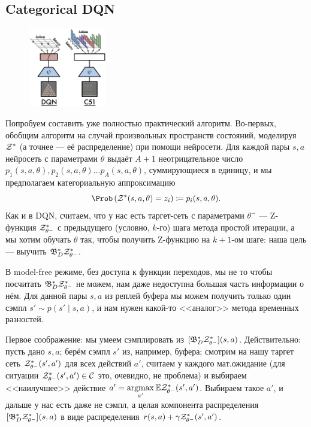 \subsection{Categorical DQN}\label{subsec:c51}

\begin{figure}
\vspace{-0.5cm}
\centering
\includegraphics[width=0.3\textwidth]{Images/c51.png}
\vspace{-0.5cm}
\end{figure}
Попробуем составить уже полностью практический алгоритм. Во-первых, обобщим алгоритм на случай произвольных пространств состояний, моделируя $\mathcal{Z}^*$ (а точнее --- её распределение) при помощи нейросети. Для каждой пары $s, a$ нейросеть с параметрами $\theta$ выдаёт $A+1$ неотрицательное число $p_1(s, a, \theta), p_2(s, a, \theta) \dots p_A(s, a, \theta)$, суммирующиеся в единицу, и мы предполагаем категориальную аппроксимацию
$$\Prob \left( \Z^*(s, a, \theta) = z_i \right) \coloneqq p_i(s, a, \theta).$$
Как и в DQN, считаем, что у нас есть таргет-сеть с параметрами $\theta^{-}$ --- Z-функция $\mathcal{Z}^*_{\theta^-}$ с предыдущего (условно, $k$-го) шага метода простой итерации, а мы хотим обучать $\theta$ так, чтобы получить Z-функцию на $k+1$-ом шаге: наша цель --- выучить $\mathfrak{B}^*_D \mathcal{Z}^*_{\theta^-}$. 

В model-free режиме, без доступа к функции переходов, мы не то чтобы посчитать $\mathfrak{B}^*_D \mathcal{Z}^*_{\theta^-}$ не можем, нам даже недоступна большая часть информации о нём. Для данной пары $s, a$ из реплей буфера мы можем получить только один сэмпл $s' \sim p(s' \mid s, a)$, и нам нужен какой-то <<аналог>> метода временных разностей.

Первое соображение: мы умеем сэмплировать из $[\mathfrak{B}^*_D \mathcal{Z}^*_{\theta^-}](s, a)$. Действительно: пусть дано $s, a$; берём сэмпл $s'$ из, например, буфера; смотрим на нашу таргет сеть $\mathcal{Z}^*_{\theta^-}(s', a')$ для всех действий $a'$, считаем у каждого мат.ожидание (для ситуации $\mathcal{Z}^*_{\theta^-}(s', a') \in \mathcal{C}$ это, очевидно, не проблема) и выбираем <<наилучшее>> действие $a' \HM= \argmax\limits_{a'} \E \Z^*_{\theta^-}(s', a')$. Выбираем такое $a'$, и дальше у нас есть даже не сэмпл, а целая компонента распределения $[\mathfrak{B}^*_D \mathcal{Z}^*_{\theta^-}](s, a)$ в виде распределения $r(s, a) + \gamma \mathcal{Z}^*_{\theta^-}(s', a')$. 

